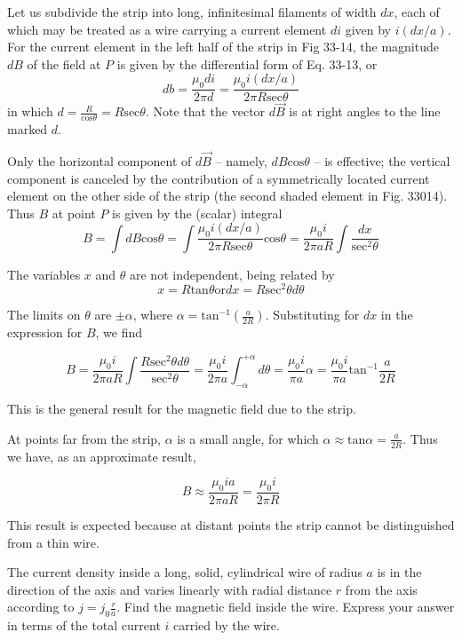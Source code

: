 \documentclass[11pt,letterpaper,boxed]{pset}
\begin{document}
    \begin{solution}
    Let us subdivide the strip into long, infinitesimal filaments of width $dx$, each of which may be treated as a wire carrying a current element $di$ given by $i(dx/a)$. For the current element in the left half of the strip in Fig 33-14, the magnitude $dB$ of the field at $P$ is given by the differential form of Eq. 33-13, or 
    \[db = \frac{\mu_0di}{2\pi d} = \frac{\mu_0i(dx/a)}{2\pi R \text{sec}\theta}\]
    in which $d=\frac{R}{\text{cos}\theta}=R\text{sec}\theta$. Note that the vector $d\Vec{B}$ is at right angles to the line marked $d$. 
    
    \smallskip
    Only the horizontal component of $d\Vec{B}$ -- namely, $dB \text{cos}\theta$ -- is effective; the vertical component is canceled by the contribution of a symmetrically located current element on the other side of the strip (the second shaded element in Fig. 33014). Thus $B$ at point $P$ is given by the (scalar) integral 
    \[B = \int dB \text{cos} \theta = \int \frac{\mu_0i(dx/a)}{2\pi R \text{sec}\theta}\text{cos}\theta = \frac{\mu_0i}{2\pi aR}\int \frac{dx}{\text{sec}^2\theta}\]
    
    The variables $x$ and $\theta$ are not independent, being related by 
    \[x = R \text{tan} \theta \text{or} dx = R \text{sec}^2\theta d\theta\]
    
    The limits on $\theta$ are $\pm \alpha$, where $\alpha=\text{tan}^{-1}(\frac{a}{2R})$. Substituting for $dx$ in the expression for $B$, we find
    
    \[B = \frac{\mu_0i}{2\pi aR} \int \frac{R \text{sec}^2\theta d\theta}{\text{sec}^2\theta} = \frac{\mu_0i}{2\pi a} \int^{+\alpha}_{-\alpha}d\theta = \frac{\mu_0i}{\pi a}\alpha = \frac{\mu_0i}{\pi a}\text{tan}^{-1}\frac{a}{2R}\]
    
    This is the general result for the magnetic field due to the strip.
    
    \smallskip
    At points far from the strip, $\alpha$ is a small angle, for which $\alpha \approx \text{tan} \alpha = \frac{a}{2R}$. Thus we have, as an approximate result, 
    
    \[B \approx \frac{\mu_0ia}{2\pi aR} = \frac{\mu_0i}{2\pi R}\]
    
    This result is expected because at distant points the strip cannot be distinguished from a thin wire.
    \end{solution}
    \newpage
    
    \begin{problem} [P33.13]
    The current density inside a long, solid, cylindrical wire of radius $a$ is in the direction of the axis and varies linearly with radial distance $r$ from the axis according to $j = j_0\frac{r}{a}$. Find the magnetic field inside the wire. Express your answer in terms of the total current $i$ carried by the wire.
    \end{problem}
    \newpage
\end{document}
